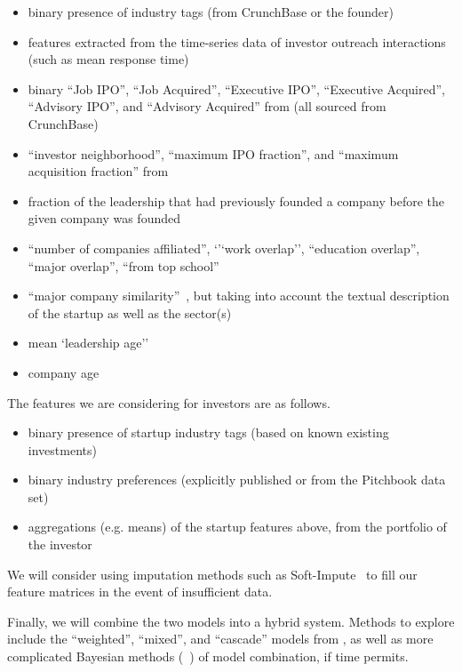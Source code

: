 \begin{itemize}
  \item binary presence of industry tags (from CrunchBase or the founder)
  \item features extracted from the time-series data of investor outreach interactions (such as mean response time)
  \item binary ``Job IPO'', ``Job Acquired'', ``Executive IPO'', ``Executive Acquired'', ``Advisory IPO'', and ``Advisory Acquired'' from \cite{2017arXiv170604229H} (all sourced from CrunchBase)
  \item ``investor neighborhood'', ``maximum IPO fraction'', and ``maximum acquisition fraction'' from \cite{2017arXiv170604229H}
  \item fraction of the leadership that had previously founded a company before the given company was founded~\cite{2017arXiv170604229H}
  \item ``number of companies affiliated'', `'`work overlap'', ``education overlap'', ``major overlap'', ``from top school''~\cite{2017arXiv170604229H}
  \item ``major company similarity''~\cite{2017arXiv170604229H}, but taking into account the textual description of the startup as well as the sector(s)
  \item mean `leadership age''~\cite{2017arXiv170604229H}
  \item company age
\end{itemize}

The features we are considering for investors are as follows.

\begin{itemize}
  \item binary presence of startup industry tags (based on known existing investments)
  \item binary industry preferences (explicitly published or from the Pitchbook data set)
  \item aggregations (e.g. means) of the startup features above, from the portfolio of the investor
\end{itemize}

We will consider using imputation methods such as Soft-Impute~\cite{mazumder2010spectral} to fill our feature matrices in the event of insufficient data.

Finally, we will combine the two models into a hybrid system. Methods to explore include the ``weighted'', ``mixed'', and ``cascade'' models from \cite{Burke2002}, as well as more complicated Bayesian methods (~\cite{DECAMPOS2010785}) of model combination, if time permits.
